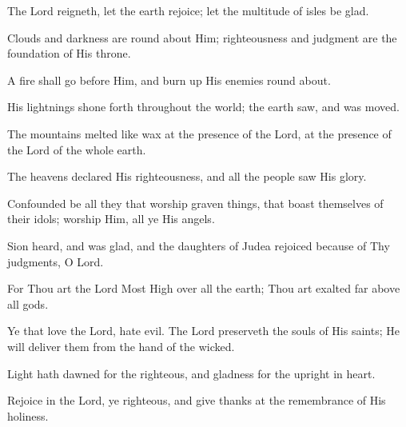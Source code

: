 The Lord reigneth, let the earth rejoice; let the multitude of isles be glad.

Clouds and darkness are round about Him; righteousness and judgment are the foundation of His throne.

A fire shall go before Him, and burn up His enemies round about.

His lightnings shone forth throughout the world; the earth saw, and was moved.

The mountains melted like wax at the presence of the Lord, at the presence of the Lord of the whole earth.

The heavens declared His righteousness, and all the people saw His glory.

Confounded be all they that worship graven things, that boast themselves of their idols; worship Him, all ye His angels.

Sion heard, and was glad, and the daughters of Judea rejoiced because of Thy judgments, O Lord.

For Thou art the Lord Most High over all the earth; Thou art exalted far above all gods.

Ye that love the Lord, hate evil. The Lord preserveth the souls of His saints; He will deliver them from the hand of the wicked.

Light hath dawned for the righteous, and gladness for the upright in heart.

Rejoice in the Lord, ye righteous, and give thanks at the remembrance of His holiness.

